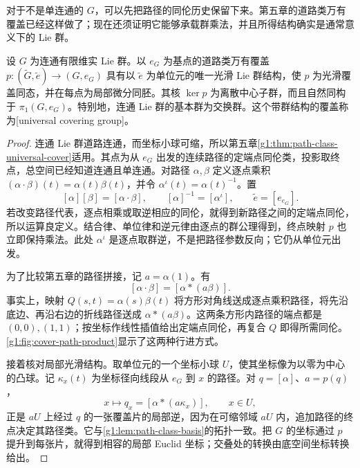 对于不是单连通的 \(G\)，可以先把路径的同伦历史保留下来。第五章的道路类万有覆盖已经这样做了；现在还须证明它能够承载群乘法，并且所得结构确实是通常意义下的 Lie 群。

\begin{theorem}
	\label{g1:thm:universal-cover-lie-group}
	设 \(G\) 为连通有限维实 Lie 群。以 \(e_G\) 为基点的道路类万有覆盖
	\(p:(\widetilde G,\widetilde e)\to(G,e_G)\)
	具有以 \(\widetilde e\) 为单位元的唯一光滑 Lie 群结构，使 \(p\) 为光滑覆盖同态，并在每点为局部微分同胚。其核 \(\ker p\) 为离散中心子群，而且自然同构于 \(\pi_1(G,e_G)\)。特别地，连通 Lie 群的基本群为交换群。这个带群结构的覆盖称为[universal covering group]。
\end{theorem}
\begin{proof}
	连通 Lie 群道路连通，而坐标小球可缩，所以第五章\cref{g1:thm:path-class-universal-cover}适用。其点为从 \(e_G\) 出发的连续路径的定端点同伦类，投影取终点，总空间已经知道连通且单连通。对路径 \(\alpha,\beta\) 定义逐点乘积 \((\alpha\cdot\beta)(t)=\alpha(t)\beta(t)\)，并令 \(\alpha^\iota(t)=\alpha(t)^{-1}\)。置
	\begin{equation}
		\label{g1:eq:universal-cover-group-product}
		[\alpha][\beta]=[\alpha\cdot\beta],\qquad
		[\alpha]^{-1}=[\alpha^\iota],\qquad
		\widetilde e=[e_{e_G}].
	\end{equation}
	若改变路径代表，逐点相乘或取逆相应的同伦，就得到新路径之间的定端点同伦，所以运算良定义。结合律、单位律和逆元律由逐点的群公理得到，终点映射 \(p\) 也立即保持乘法。此处 \(\alpha^\iota\) 是逐点取群逆，不是把路径参数反向；它仍从单位元出发。

	为了比较第五章的路径拼接，记 \(a=\alpha(1)\)。有
	\begin{equation}
		\label{g1:eq:pointwise-product-concatenation}
		[\alpha\cdot\beta]=[\alpha*(a\beta)].
	\end{equation}
	事实上，映射 \(Q(s,t)=\alpha(s)\beta(t)\) 将方形对角线送成逐点乘积路径，将先沿底边、再沿右边的折线路径送成 \(\alpha*(a\beta)\)。这两条方形内路径的端点都是 \((0,0),(1,1)\)；按坐标作线性插值给出定端点同伦，再复合 \(Q\) 即得所需同伦。\cref{g1:fig:cover-path-product}显示了这两种行进方式。

	接着核对局部光滑结构。取单位元的一个坐标小球 \(U\)，使其坐标像为以零为中心的凸球。记 \(\kappa_x(t)\) 为坐标径向线段从 \(e_G\) 到 \(x\) 的路径。对 \(q=[\alpha]\)、\(a=p(q)\)，
	\[
		x\longmapsto q_x=[\alpha*(a\kappa_x)],\qquad x\in U,
	\]
	正是 \(aU\) 上经过 \(q\) 的一张覆盖片的局部逆，因为在可缩邻域 \(aU\) 内，追加路径的终点决定其路径类。它与\cref{g1:lem:path-class-basis}的拓扑一致。把 \(G\) 的坐标通过 \(p\) 提升到每张片，就得到相容的局部 Euclid 坐标；交叠处的转换由底空间坐标转换给出。


\end{proof}
